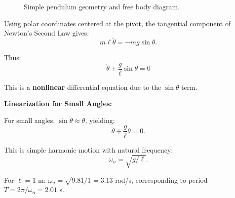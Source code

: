 \begin{figure}[htbp]
\centering
{}
\caption{Simple pendulum geometry and free body diagram.}
\label{fig:pendulum}
\end{figure}

Using polar coordinates centered at the pivot, the tangential component of Newton's Second Law gives:
\begin{equation}
m\ell\ddot{\theta} = -mg\sin\theta.
\end{equation}

Thus:
\begin{equation}
\boxed{\ddot{\theta} + \frac{g}{\ell}\sin\theta = 0}
\end{equation}

This is a \textbf{nonlinear} differential equation due to the $\sin\theta$ term.

\textbf{Linearization for Small Angles:}

For small angles, $\sin\theta \approx \theta$, yielding:
\begin{equation}
\ddot{\theta} + \frac{g}{\ell}\theta = 0.
\end{equation}

This is simple harmonic motion with natural frequency:
\begin{equation}
\omega_n = \sqrt{g/\ell}.
\end{equation}

For $\ell = 1$ m: $\omega_n = \sqrt{9.81/1} = 3.13$ rad/s, corresponding to period $T = 2\pi/\omega_n = 2.01$ s.

